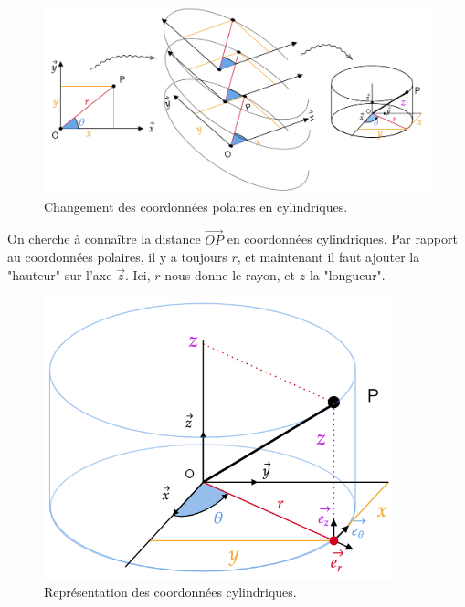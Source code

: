 \documentclass[
	11pt, %
	fleqn, %
	a4paper, %
]{LegrandOrangeBook}
\begin{document}
\begin{figure}[H] %
	\centering %
	\includegraphics[width=1\textwidth]{Images/cyl1.png} %
	\caption{Changement des coordonnées polaires en cylindriques.}
	\label{cyl1} %
\end{figure}

On cherche à connaître la distance $\Vec{OP}$ en coordonnées cylindriques. Par rapport au coordonnées polaires, il y a toujours $r$, et maintenant il faut ajouter la "hauteur" sur l'axe $\Vec{z}$. Ici, $r$ nous donne le rayon, et $z$ la "longueur".


\begin{figure}[H] %
	\centering %
	\includegraphics[width=0.9\textwidth]{Images/cyl3.png} %
	\caption{Représentation des coordonnées cylindriques.}
	\label{cyl3} %
\end{figure}
\end{document}
